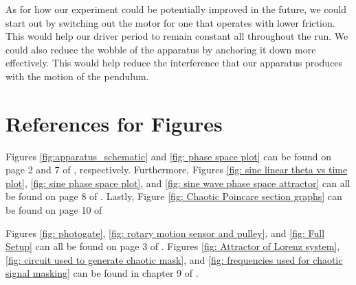 \documentclass[twocolumn,amsmath,amssymb,pra, floatfix]{revtex4-2}
\begin{document}
As for how our experiment could be potentially improved in the future, we could start out by switching out the motor for one that operates with lower friction. This would help our driver period to remain constant all throughout the run. We could also reduce the wobble of the apparatus by anchoring it down more effectively. This would help reduce the interference that our apparatus produces with the motion of the pendulum. 

\section{References for Figures}
Figures \ref{fig:apparatus_schematic} and \ref{fig: phase space plot} can be found on page 2 and 7 of \cite{floridalab}, respectively. Furthermore, Figures \ref{fig: sine linear theta vs time plot}, \ref{fig: sine phase space plot}, and \ref{fig: sine wave phase space attractor} can all be found on page 8 of \cite{floridalab}. Lastly, Figure \ref{fig: Chaotic Poincare section graphs} can be found on page 10 of \cite{floridalab}

Figures \ref{fig: photogate}, \ref{fig: rotary motion sensor and pulley}, and \ref{fig: Full Setup} can all be found on page 3 of \cite{pascolab}. Figures \ref{fig: Attractor of Lorenz system}, \ref{fig: circuit used to generate chaotic mask}, and \ref{fig: frequencies used for chaotic signal masking} can be found in chapter 9 of \cite{Strogatz}.



\end{document}
